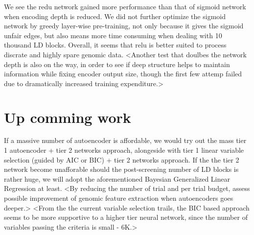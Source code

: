 \documentclass[acmtog, authorversion]{acmart}
\begin{document}
We see the redu network gained more performance than that of sigmoid network when encoding depth is reduced. We did not further optimize the sigmoid network by greedy layer-wise pre-training, not only because it gives the sigmoid unfair edges, but also means more time consuming when dealing with 10 thousand LD blocks. Overall, it seems that relu is better suited to process discrate and highly spare genomic data.
<Another test that doulbes the network depth is also on the way, in order to see if deep structure helps to maintain information while fixing encoder output size, though the first few attemp failed due to dramatically increased training expenditure.>

\section{Up comming work}
If a massive number of autoencoder is affordable, we would try out the mass tier 1 autoencoder + tier 2 networks approach, alongeside with tier 1 linear variable selection (guided by AIC or BIC) + tier 2 networks approach. If the the tier 2 network become unafforable should the post-screening number of LD blocks is rather huge, we will adopt the aforementioned Bayesian Generalized Linear Regression at least.
<By reducing the number of trial and per trial budget, assess possible improvement of genomic feature extraction when autoencoders goes deeper.>
<From the the current variable selection trails, the BIC based approach seems to be more supportive to a higher tier neural network, since the number of variables passing the criteria is small - 6K.>



\end{document}
